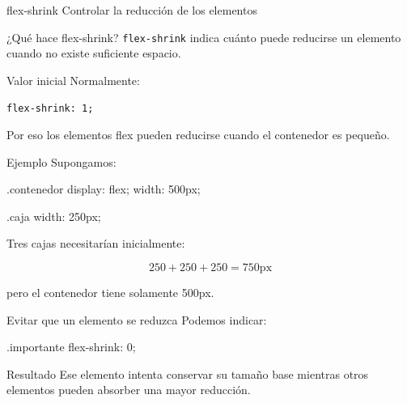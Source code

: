 \documentclass[aspectratio=169,11.5pt]{beamer}
\begin{document}
    \SectionSlide
    {flex-shrink}
    {Controlar la reducción de los elementos}

    \begin{frame}{¿Qué hace flex-shrink?}
        \texttt{flex-shrink} indica cuánto puede reducirse
        un elemento cuando no existe suficiente espacio.

        \begin{block}{Valor inicial}
            Normalmente:

            \texttt{flex-shrink: 1;}
        \end{block}

        Por eso los elementos flex pueden reducirse
        cuando el contenedor es pequeño.
    \end{frame}

    \begin{frame}[fragile]{Ejemplo}
        Supongamos:

        \begin{csscodedark}
            .contenedor {
                display: flex;
                width: 500px;
            }

            .caja {
                width: 250px;
            }
        \end{csscodedark}

        Tres cajas necesitarían inicialmente:

        \[
        250 + 250 + 250 = 750\text{px}
        \]

        pero el contenedor tiene solamente 500px.
    \end{frame}

    \begin{frame}[fragile]{Evitar que un elemento se reduzca}
        Podemos indicar:

        \begin{csscodedark}
            .importante {
                flex-shrink: 0;
            }
        \end{csscodedark}

        \begin{block}{Resultado}
            Ese elemento intenta conservar
            su tamaño base mientras otros elementos
            pueden absorber una mayor reducción.
        \end{block}
    \end{frame}
\end{document}
